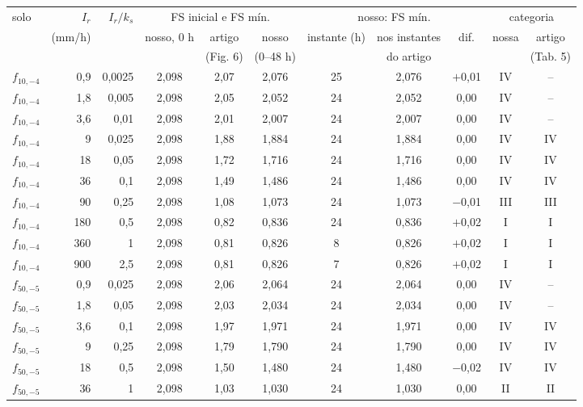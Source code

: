 \begin{tabular}{lrr|ccc|ccc|cc}
\toprule
solo & $I_r$ & $I_r/k_s$ & \multicolumn{3}{c|}{FS inicial e FS mín.} & \multicolumn{3}{c|}{nosso: FS mín.} & \multicolumn{2}{c}{categoria}\\
 & (mm/h) & & nosso, 0 h & artigo & nosso & instante (h) & nos instantes & dif. & nossa & artigo\\
 & & & & (Fig. 6) & (0--48 h) & & do artigo & & & (Tab. 5)\\
\midrule
$f_{10,-4}$ & 0{,}9 & 0{,}0025 & 2{,}098 & 2{,}07 & 2{,}076 & 25 & 2{,}076 & $+$0{,}01 & IV & --\\
$f_{10,-4}$ & 1{,}8 & 0{,}005 & 2{,}098 & 2{,}05 & 2{,}052 & 24 & 2{,}052 & 0{,}00 & IV & --\\
$f_{10,-4}$ & 3{,}6 & 0{,}01 & 2{,}098 & 2{,}01 & 2{,}007 & 24 & 2{,}007 & 0{,}00 & IV & --\\
$f_{10,-4}$ & 9 & 0{,}025 & 2{,}098 & 1{,}88 & 1{,}884 & 24 & 1{,}884 & 0{,}00 & IV & IV\\
$f_{10,-4}$ & 18 & 0{,}05 & 2{,}098 & 1{,}72 & 1{,}716 & 24 & 1{,}716 & 0{,}00 & IV & IV\\
$f_{10,-4}$ & 36 & 0{,}1 & 2{,}098 & 1{,}49 & 1{,}486 & 24 & 1{,}486 & 0{,}00 & IV & IV\\
$f_{10,-4}$ & 90 & 0{,}25 & 2{,}098 & 1{,}08 & 1{,}073 & 24 & 1{,}073 & $-$0{,}01 & III & III\\
$f_{10,-4}$ & 180 & 0{,}5 & 2{,}098 & 0{,}82 & 0{,}836 & 24 & 0{,}836 & $+$0{,}02 & I & I\\
$f_{10,-4}$ & 360 & 1 & 2{,}098 & 0{,}81 & 0{,}826 & 8 & 0{,}826 & $+$0{,}02 & I & I\\
$f_{10,-4}$ & 900 & 2{,}5 & 2{,}098 & 0{,}81 & 0{,}826 & 7 & 0{,}826 & $+$0{,}02 & I & I\\
\midrule
$f_{50,-5}$ & 0{,}9 & 0{,}025 & 2{,}098 & 2{,}06 & 2{,}064 & 24 & 2{,}064 & 0{,}00 & IV & --\\
$f_{50,-5}$ & 1{,}8 & 0{,}05 & 2{,}098 & 2{,}03 & 2{,}034 & 24 & 2{,}034 & 0{,}00 & IV & --\\
$f_{50,-5}$ & 3{,}6 & 0{,}1 & 2{,}098 & 1{,}97 & 1{,}971 & 24 & 1{,}971 & 0{,}00 & IV & IV\\
$f_{50,-5}$ & 9 & 0{,}25 & 2{,}098 & 1{,}79 & 1{,}790 & 24 & 1{,}790 & 0{,}00 & IV & IV\\
$f_{50,-5}$ & 18 & 0{,}5 & 2{,}098 & 1{,}50 & 1{,}480 & 24 & 1{,}480 & $-$0{,}02 & IV & IV\\
$f_{50,-5}$ & 36 & 1 & 2{,}098 & 1{,}03 & 1{,}030 & 24 & 1{,}030 & 0{,}00 & II & II\\

\end{tabular}
